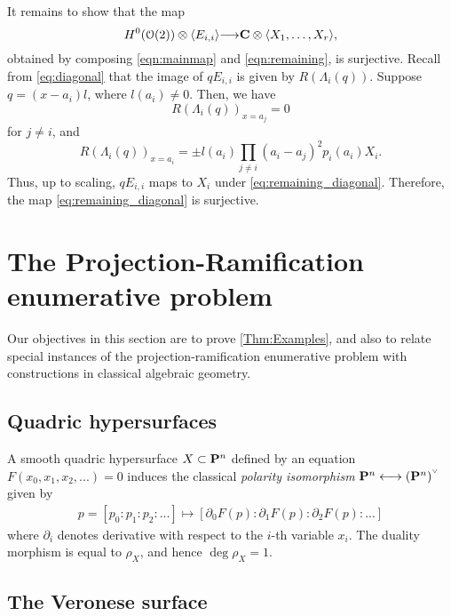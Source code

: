 \documentclass[11pt,reqno]{amsart}
\theoremstyle{plain}
\theoremstyle{definition}
\theoremstyle{remark}
\numberwithin{equation}{section}
\renewcommand{\to}{{\longrightarrow}}
\numberwithin{equation}{section}
\renewcommand{\O}{\mathcal O}
\newcommand{\smvee}{\raise0.5ex\hbox{$\scriptscriptstyle\vee$}}
\begin{document}
It remains to show that the map
\begin{equation}\label{eq:remaining_diagonal}
  H^0(\O(2)) \otimes \langle  E_{i,i} \rangle \to \C \otimes \langle  X_1, \dots, X_r \rangle,
\end{equation}
obtained by composing \eqref{eqn:mainmap} and \eqref{eqn:remaining}, is surjective.
Recall from \eqref{eq:diagonal} that the image of $q E_{i,i}$ is given by $R(\Lambda_i(q))$.
Suppose $q = (x-a_i)l$, where $l(a_i) \neq 0$.
Then, we have
\[ R(\Lambda_i(q))_{x = a_j} = 0\]
for $j \neq i$, and
\[ R(\Lambda_i(q))_{x = a_i} = \pm l(a_i) \prod_{j \neq i}(a_i-a_j)^2 p_i(a_i) X_i.\]
Thus, up to scaling, $qE_{i,i}$ maps to $X_i$ under \eqref{eq:remaining_diagonal}.
Therefore, the map \eqref{eq:remaining_diagonal} is surjective.







\section{The Projection-Ramification enumerative problem} %
\label{sec:enumerativeproblems}

Our objectives in this section are to prove \autoref{Thm:Examples}, and also to relate special instances of the projection-ramification enumerative problem with constructions in classical algebraic geometry.


\subsection{Quadric hypersurfaces} %
\label{sub:a_quadric_surface}
A smooth quadric hypersurface $X \subset \P^{n}$ defined by an equation $F(x_{0},x_{1},x_{2}, ...) = 0$ induces the classical {\sl polarity isomorphism} $\P^{n} \longleftrightarrow (\P^{n})^{\smvee}$ given by 
\begin{align*}
  p = [p_{0}:p_{1}:p_{2}: ...] \mapsto [\partial_{0}F(p):\partial_{1}F(p):\partial_{2}F(p): ...]
\end{align*}
where $\partial_{i}$ denotes derivative with respect to the $i$-th variable $x_{i}$. The duality morphism is equal to $\rho_{X}$, and hence $\deg \rho_{X} = 1$.  



\subsection{The Veronese surface} %
\end{document}
